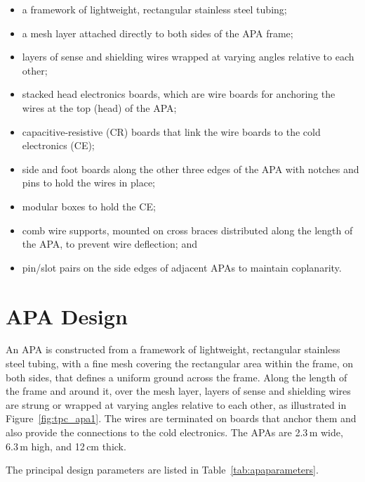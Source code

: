 \begin{itemize}
\item a framework of lightweight, rectangular stainless steel tubing;
\item a mesh layer attached directly to both sides of the APA frame;
\item layers of sense and shielding wires wrapped at varying angles relative to each other;
\item stacked head electronics boards, which are wire boards for anchoring the wires at the top (head) of the APA;
\item capacitive-resistive (CR) boards that link the wire boards to the cold electronics (CE);
\item side and foot boards along the other three edges of the APA with notches and pins to hold the wires in place;
\item modular boxes to hold the CE;
\item comb wire supports, mounted on cross braces distributed along the length of the APA, to prevent wire deflection; and
\item pin/slot pairs on the side edges of adjacent APAs to maintain coplanarity.
\end{itemize}




\section{APA Design}
\label{sec:fdsp-apa-design}

An APA is constructed from a framework of lightweight, rectangular stainless steel tubing, with a fine mesh covering the rectangular area within the frame, on both sides, that defines a uniform ground across the frame. Along the length of the frame and around it, over the mesh layer, layers of sense and shielding wires are strung or wrapped at varying angles relative to each other, as illustrated in  Figure~\ref{fig:tpc_apa1}. The wires are terminated on  boards that anchor them and also provide the connections to the cold electronics. The APAs are 2.3\,m wide, 6.3\,m high, and 12\,cm thick.  

The principal design parameters are listed in Table~\ref{tab:apaparameters}.


